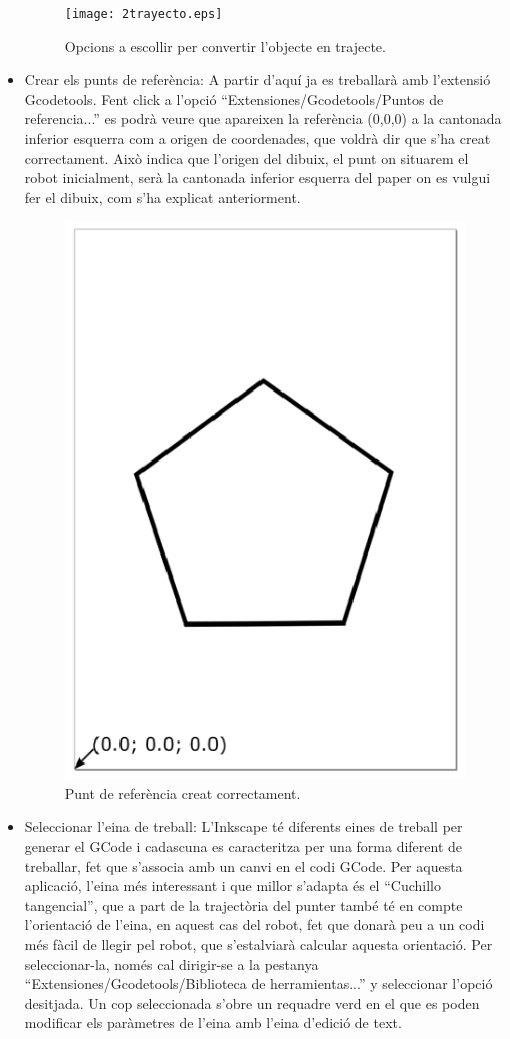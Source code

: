\begin{itemize}
	\begin{figure}[H]
		\centering
		\texttt{[image: 2trayecto.eps]}
		\caption{Opcions a escollir per convertir l'objecte en trajecte.}
		\label{fig:objeto a trayecto}
	\end{figure}
	
	\item Crear els punts de referència: A partir d'aquí ja es treballarà amb l'extensió Gcodetools. Fent click a l'opció “Extensiones/Gcodetools/Puntos de referencia...” es podrà veure que apareixen la referència (0,0,0) a la cantonada inferior esquerra com a origen de coordenades, que voldrà dir que s'ha creat correctament. Això indica que l'origen del dibuix, el punt on situarem el robot inicialment, serà la cantonada inferior esquerra del paper on es vulgui fer el dibuix, com s'ha explicat anteriorment.
	
	\begin{figure}[H]
		\centering
		\includegraphics[width=0.40\linewidth]{3PuntosReferencia.eps}
		\caption{Punt de referència creat correctament.}
		\label{fig:PuntosReferencia}
	\end{figure}

	\item Seleccionar l'eina de treball: L'Inkscape té diferents eines de treball per generar el GCode i cadascuna es caracteritza per una forma diferent de treballar, fet que s'associa amb un canvi en el codi GCode. Per aquesta aplicació, l'eina més interessant i que millor s'adapta és el “Cuchillo tangencial”, que a part de la trajectòria del punter també té en compte l'orientació de l'eina, en aquest cas del robot, fet que donarà peu a un codi més fàcil de llegir pel robot, que s'estalviarà calcular aquesta orientació. Per seleccionar-la, només cal dirigir-se a la pestanya “Extensiones/Gcodetools/Biblioteca de herramientas...” y seleccionar l'opció desitjada. Un cop seleccionada s'obre un requadre verd en el que es poden modificar els paràmetres de l'eina amb l'eina d'edició de text.
	

\end{itemize}
